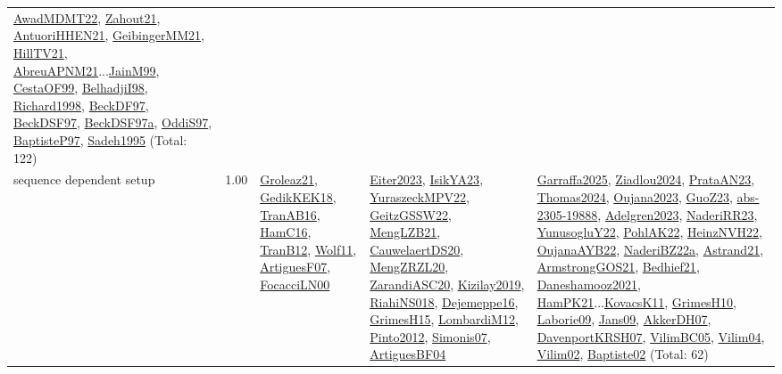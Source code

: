 {\begin{longtable}{p{3cm}r>{\raggedright\arraybackslash}p{6cm}>{\raggedright\arraybackslash}p{6cm}>{\raggedright\arraybackslash}p{8cm}}
\hyperref[detail:AwadMDMT22]{AwadMDMT22}, \hyperref[detail:Zahout21]{Zahout21}, \hyperref[detail:AntuoriHHEN21]{AntuoriHHEN21}, \hyperref[detail:GeibingerMM21]{GeibingerMM21}, \hyperref[detail:HillTV21]{HillTV21}, \hyperref[detail:AbreuAPNM21]{AbreuAPNM21}...\hyperref[detail:JainM99]{JainM99}, \hyperref[detail:CestaOF99]{CestaOF99}, \hyperref[detail:BelhadjiI98]{BelhadjiI98}, \hyperref[detail:Richard1998]{Richard1998}, \hyperref[detail:BeckDF97]{BeckDF97}, \hyperref[detail:BeckDSF97]{BeckDSF97}, \hyperref[detail:BeckDSF97a]{BeckDSF97a}, \hyperref[detail:OddiS97]{OddiS97}, \hyperref[detail:BaptisteP97]{BaptisteP97}, \hyperref[detail:Sadeh1995]{Sadeh1995} (Total: 122)\\
\index{sequence dependent setup}\index{Concepts!sequence dependent setup}sequence dependent setup &  1.00 & \hyperref[detail:Groleaz21]{Groleaz21}, \hyperref[detail:GedikKEK18]{GedikKEK18}, \hyperref[detail:TranAB16]{TranAB16}, \hyperref[detail:HamC16]{HamC16}, \hyperref[detail:TranB12]{TranB12}, \hyperref[detail:Wolf11]{Wolf11}, \hyperref[detail:ArtiguesF07]{ArtiguesF07}, \hyperref[detail:FocacciLN00]{FocacciLN00} & \hyperref[detail:Eiter2023]{Eiter2023}, \hyperref[detail:IsikYA23]{IsikYA23}, \hyperref[detail:YuraszeckMPV22]{YuraszeckMPV22}, \hyperref[detail:GeitzGSSW22]{GeitzGSSW22}, \hyperref[detail:MengLZB21]{MengLZB21}, \hyperref[detail:CauwelaertDS20]{CauwelaertDS20}, \hyperref[detail:MengZRZL20]{MengZRZL20}, \hyperref[detail:ZarandiASC20]{ZarandiASC20}, \hyperref[detail:Kizilay2019]{Kizilay2019}, \hyperref[detail:RiahiNS018]{RiahiNS018}, \hyperref[detail:Dejemeppe16]{Dejemeppe16}, \hyperref[detail:GrimesH15]{GrimesH15}, \hyperref[detail:LombardiM12]{LombardiM12}, \hyperref[detail:Pinto2012]{Pinto2012}, \hyperref[detail:Simonis07]{Simonis07}, \hyperref[detail:ArtiguesBF04]{ArtiguesBF04} & \hyperref[detail:Garraffa2025]{Garraffa2025}, \hyperref[detail:Ziadlou2024]{Ziadlou2024}, \hyperref[detail:PrataAN23]{PrataAN23}, \hyperref[detail:Thomas2024]{Thomas2024}, \hyperref[detail:Oujana2023]{Oujana2023}, \hyperref[detail:GuoZ23]{GuoZ23}, \hyperref[detail:abs-2305-19888]{abs-2305-19888}, \hyperref[detail:Adelgren2023]{Adelgren2023}, \hyperref[detail:NaderiRR23]{NaderiRR23}, \hyperref[detail:YunusogluY22]{YunusogluY22}, \hyperref[detail:PohlAK22]{PohlAK22}, \hyperref[detail:HeinzNVH22]{HeinzNVH22}, \hyperref[detail:OujanaAYB22]{OujanaAYB22}, \hyperref[detail:NaderiBZ22a]{NaderiBZ22a}, \hyperref[detail:Astrand21]{Astrand21}, \hyperref[detail:ArmstrongGOS21]{ArmstrongGOS21}, \hyperref[detail:Bedhief21]{Bedhief21}, \hyperref[detail:Daneshamooz2021]{Daneshamooz2021}, \hyperref[detail:HamPK21]{HamPK21}...\hyperref[detail:KovacsK11]{KovacsK11}, \hyperref[detail:GrimesH10]{GrimesH10}, \hyperref[detail:Laborie09]{Laborie09}, \hyperref[detail:Jans09]{Jans09}, \hyperref[detail:AkkerDH07]{AkkerDH07}, \hyperref[detail:DavenportKRSH07]{DavenportKRSH07}, \hyperref[detail:VilimBC05]{VilimBC05}, \hyperref[detail:Vilim04]{Vilim04}, \hyperref[detail:Vilim02]{Vilim02}, \hyperref[detail:Baptiste02]{Baptiste02} (Total: 62)\\

\end{longtable}}
